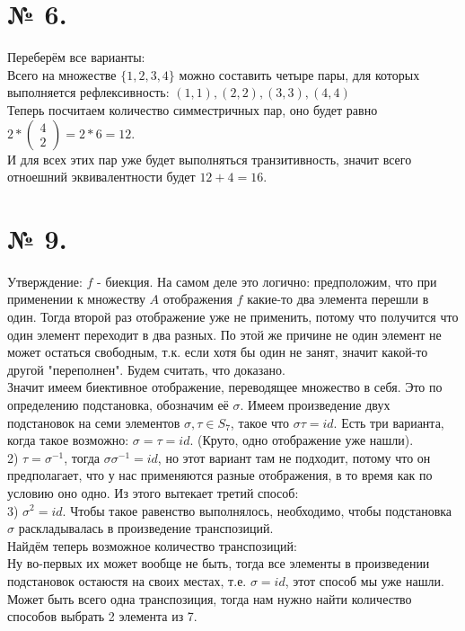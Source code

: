 \documentclass[a4paper,11pt]{report}
\begin{document}
\section{№ 6.}
Переберём все варианты:\\
Всего на множестве $\{1, 2, 3, 4\}$ можно составить четыре пары, для которых выполняется рефлексивность: 
$(1, 1), (2, 2), (3, 3), (4, 4)$\\
Теперь посчитаем количество симместричных пар, оно будет равно $2 * 
\begin{pmatrix}
4\\
2
\end{pmatrix}
= 2 *6 = 12$.\\
И для всех этих пар уже будет выполняться транзитивность, значит всего отноешний эквивалентности будет
$12 + 4 = 16$.
\section{№ 9.}
Утверждение: $f$ - биекция. На самом деле это логично: предположим, что при применении к множеству $A$ отображения $f$
какие-то два элемента перешли в один. Тогда второй раз отображение уже не применить, потому что получится что один элемент 
переходит в два разных. По этой же причине не один элемент не может остаться свободным, т.к. если хотя бы один не занят, значит
какой-то другой "переполнен". Будем считать, что доказано.\\
Значит имеем биективное отображение, переводящее множество в себя. Это по определению подстановка, обозначим её $\sigma$.
Имеем произведение двух подстановок на семи элементов $\sigma, \tau \in S_7$, такое что $\sigma\tau = id$.
Есть три варианта, когда такое возможно: $\sigma = \tau = id$. (Круто, одно отображение уже нашли).\\
2) $\tau = \sigma^{-1}$, тогда $\sigma\sigma^{-1} = id$, но этот вариант там не подходит, потому что он предполагает, что у нас
применяются разные отображения, в то время как по условию оно одно. Из этого вытекает третий способ:\\
3) $\sigma^2 = id$. Чтобы такое равенство выполнялось, необходимо, чтобы подстановка $\sigma$ раскладывалась в произведение
транспозиций.\\
Найдём теперь возможное количество транспозиций:\\
Ну во-первых их может вообще не быть, тогда все элементы в произведении подстановок остаюстя на своих местах, т.е. 
$\sigma = id$, этот способ мы уже нашли.\\
Может быть всего одна транспозиция, тогда нам нужно найти количество способов выбрать 2 элемента из 7.
\end{document}
